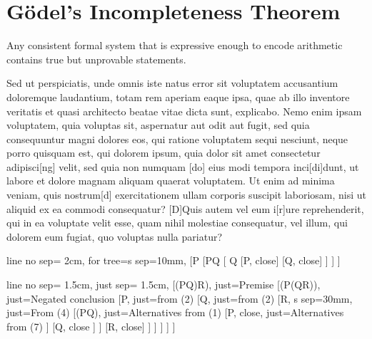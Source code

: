 \documentclass[a5paper, 10pt, openany]{book} %
\begin{document}
\section*{Gödel's Incompleteness Theorem}

Any consistent formal system that is expressive enough to encode arithmetic contains true but unprovable statements.


Sed ut perspiciatis, unde omnis iste natus error sit voluptatem accusantium doloremque laudantium, totam rem aperiam eaque ipsa, quae ab illo inventore veritatis et quasi architecto beatae vitae dicta sunt, explicabo. Nemo enim ipsam voluptatem, quia voluptas sit, aspernatur aut odit aut fugit, sed quia consequuntur magni dolores eos, qui ratione voluptatem sequi nesciunt, neque porro quisquam est, qui dolorem ipsum, quia dolor sit amet consectetur adipisci[ng] velit, sed quia non numquam [do] eius modi tempora inci[di]dunt, ut labore et dolore magnam aliquam quaerat voluptatem. Ut enim ad minima veniam, quis nostrum[d] exercitationem ullam corporis suscipit laboriosam, nisi ut aliquid ex ea commodi consequatur? [D]Quis autem vel eum i[r]ure reprehenderit, qui in ea voluptate velit esse, quam nihil molestiae consequatur, vel illum, qui dolorem eum fugiat, quo voluptas nulla pariatur?


\begin{tableau}
  {                       %
      line no sep= 2cm,   %
      for tree={s sep=10mm}, %
  }
  [P  
      [P\rightarrow Q
          [ \neg Q
              [\neg P, close]
              [Q, close]
          ]
      ]
  ]
  \end{tableau}
  
  \begin{tableau}
  {
      line no sep= 1.5cm,
      just sep= 1.5cm,  %
  }
  [(P\wedge Q)\rightarrow R), just={Premise}
      [\neg(P\rightarrow (Q\rightarrow R)), just={Negated conclusion}
          [P, just={from (2)}
              [Q, just={from (2)}
                  [\neg R, s sep=30mm, just={From (4)} %
                      [\neg(P\wedge Q),  just={Alternatives from (1)}
                          [\neg P, close, just={Alternatives from (7)}
                          ]
                          [\neg Q, close
                          ]
                      ]
                      [R, close]
                  ]
              ]
          ]
      ]
  ]
  \end{tableau}
  
\end{document}
